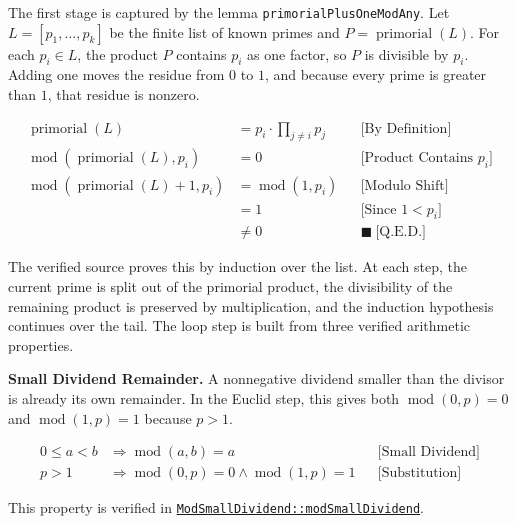 The first stage is captured by the lemma \texttt{primorialPlusOneModAny}.
Let $L = [p_1,\dots,p_k]$ be the finite list of known primes and
$P=\operatorname{primorial}(L)$. For each $p_i \in L$, the product $P$
contains $p_i$ as one factor, so $P$ is divisible by $p_i$. Adding one
moves the residue from $0$ to $1$, and because every prime is greater than
$1$, that residue is nonzero.

\begin{equation*}
\begin{aligned}
\operatorname{primorial}(L)
  &= p_i \cdot \prod_{j\ne i} p_j
  &&\text{[By Definition]} \\
\operatorname{mod}(\operatorname{primorial}(L), p_i)
  &= 0
  &&\text{[Product Contains }p_i\text{]} \\
\operatorname{mod}(\operatorname{primorial}(L)+1, p_i)
  &= \operatorname{mod}(1, p_i)
  &&\text{[Modulo Shift]} \\
  &= 1
  &&\text{[Since }1 < p_i\text{]} \\
  &\ne 0
  &&\blacksquare\ \text{[Q.E.D.]}
\end{aligned}
\end{equation*}

The verified source proves this by induction over the list. At each step,
the current prime is split out of the primorial product, the divisibility
of the remaining product is preserved by multiplication, and the induction
hypothesis continues over the tail. The loop step is built from three
verified arithmetic properties.

\textbf{Small Dividend Remainder.} A nonnegative dividend smaller than the
divisor is already its own remainder. In the Euclid step, this gives both
$\operatorname{mod}(0,p)=0$ and $\operatorname{mod}(1,p)=1$ because $p>1$.

\begin{equation*}
\begin{aligned}
0 \le a < b
&\Rightarrow \operatorname{mod}(a,b)=a
&&\text{[Small Dividend]} \\
p>1
&\Rightarrow \operatorname{mod}(0,p)=0
\land \operatorname{mod}(1,p)=1
&&\text{[Substitution]}
\end{aligned}
\end{equation*}

This property is verified in
\href{https://github.com/thiagomata/prime-numbers/blob/euclid-theorem-article-v1.0.0/src/main/scala/v1/chapter2/div/properties/ModSmallDividend.scala}{\texttt{ModSmallDividend::modSmallDividend}}.

